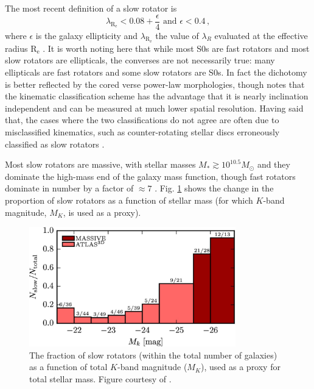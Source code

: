 	The most recent definition of a slow rotator is
	\begin{equation}
		\lambda_\mathrm{R_e} < 0.08 + \frac{\epsilon}{4} \text{    and    } \epsilon < 0.4 \, ,
	\end{equation}
	where $\epsilon$ is the galaxy ellipticity and $\lambda_\mathrm{R_e}$ the value of $\lambda_R$ evaluated at the effective radius $\mathrm{R_e}$ \citep{Cappellari2016}. %
	It is worth noting here that while most S0s are fast rotators and most slow rotators are ellipticals, the converses are not necessarily true: many ellipticals are fast rotators and some slow rotators are S0s. In fact the dichotomy is better reflected by the cored verse power-law morphologies, though \citet{Cappellari2016} notes that the kinematic classification scheme has the advantage that it is nearly inclination independent and can be measured at much lower spatial resolution. Having said that, the cases where the two classifications do not agree are often due to misclassified kinematics, such as counter-rotating stellar discs erroneously classified as slow rotators \citep[e.g.][]{Pinkney2003, Cappellari2005, Cappellari2007}. 

	Most slow rotators are massive, with stellar masses $M_\ast \gtrsim 10^{10.5} M_\odot$ and they dominate the high-mass end of the galaxy mass function, though fast rotators dominate in number by a factor of $\approx 7$ \citep[e.g.][]{Emsellem2011, Veale2017}. Fig. \ref{fig:SlowRotFrac} shows the change in the proportion of slow rotators as a function of stellar mass (for which $K$-band magnitude, $M_K$, is used as a proxy).


	\begin{figure}
		\centering
		\includegraphics[width=0.8\textwidth]{introduction/slowRotFraction.jpeg}
		\caption[Proportion of slow rotating galaxies as a function of mass]{The fraction of slow rotators (within the total number of galaxies) as a function of total $K$-band magnitude ($M_K$), used as a proxy for total stellar mass. Figure courtesy of \citet{Veale2017}.}
		\label{fig:SlowRotFrac}
	\end{figure}

